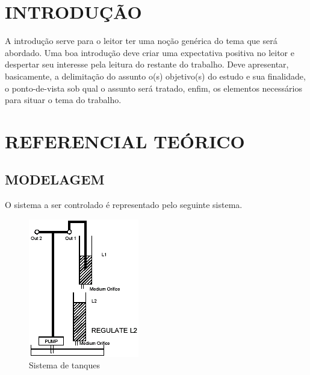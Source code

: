 \documentclass[a4paper,12pt]{article}
\begin{document}
\newpage


\thispagestyle{empty}

\begin{center}
\listoffigures
\end{center}

\newpage


\thispagestyle{empty}

\begin{center}
\tableofcontents
\end{center}

\newpage


\thispagestyle{main}

\section{INTRODUÇÃO}

\begin{flushleft}
\hspace{4ex}A introdução serve para o leitor ter uma noção genérica do tema que será
abordado. Uma boa introdução deve criar uma expectativa positiva no leitor e despertar
seu interesse pela leitura do restante do trabalho. Deve apresentar, basicamente, a
delimitação do assunto o(s) objetivo(s) do estudo e sua finalidade, o ponto-de-vista sob
qual o assunto será tratado, enfim, os elementos necessários para situar o tema do
trabalho.
\end{flushleft}

\newpage


\thispagestyle{main}

\section{REFERENCIAL TEÓRICO}

\subsection{MODELAGEM}
\hspace{4ex}O sistema a ser controlado é representado pelo seguinte sistema.
\begin{figure}[h]
\includegraphics[scale=1]{tanques.png}
\caption{Sistema de tanques}
\label{fig:tanques}
\end{figure}
\end{document}
